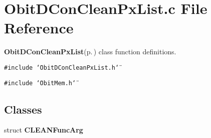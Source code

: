 \section{Obit\-DCon\-Clean\-Px\-List.c File Reference}
\label{ObitDConCleanPxList_8c}
{\bf Obit\-DCon\-Clean\-Px\-List}{\rm (p.\,\pageref{structObitDConCleanPxList})} class function definitions. 

{\tt \#include \char`\"{}Obit\-DCon\-Clean\-Px\-List.h\char`\"{}}\par
{\tt \#include \char`\"{}Obit\-Mem.h\char`\"{}}\par
\subsection*{Classes}
\begin{CompactItemize}
\item 
struct {\bf CLEANFunc\-Arg}
\end{CompactItemize}
